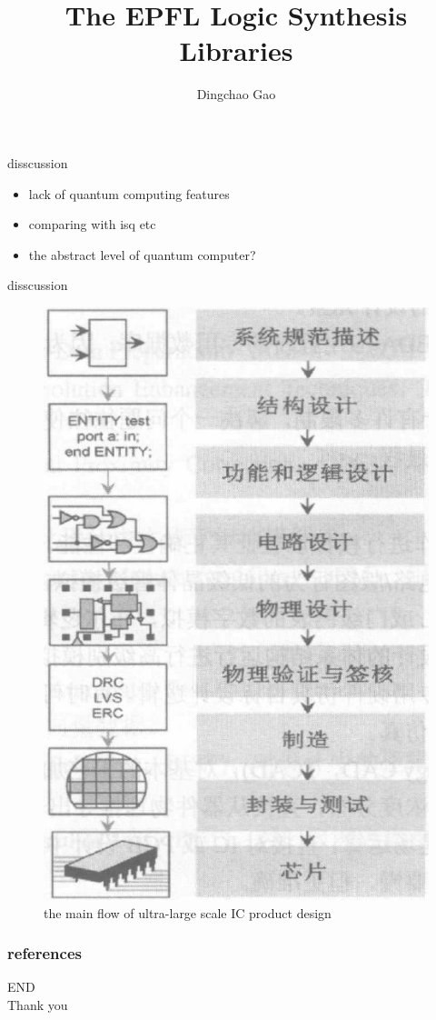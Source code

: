 \documentclass[aspectratio=1610]{beamer}
\title[logic synthesis libraries]{The EPFL Logic Synthesis Libraries}
\author[Gcc]{Dingchao Gao}
\institute[ISCAS]{Institute of Software Chinese Academy of Sciences}
\begin{document}
\begin{frame}[plain]
  \titlepage
\end{frame}






\begin{frame}{disscussion}
  \begin{itemize}
    \item lack of quantum computing features
    \item comparing with isq etc
    \item the abstract level of quantum computer? 
  \end{itemize}
\end{frame}
\begin{frame}{disscussion}
  \begin{figure}
    \centering
    \includegraphics[width = .4\linewidth]{figure/eda_flow.png}
    \caption{the main flow of ultra-large scale IC product design}
  \end{figure}
\end{frame}
\begin{frame}
	\frametitle{references}
	\printbibliography
\end{frame}

\begin{frame}
\centering
\Huge{END\\Thank you}
\end{frame}
\end{document}
